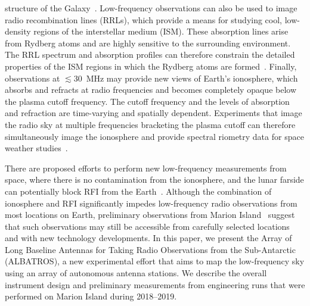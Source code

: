 \documentclass{ws-jai}
\def\albatros{ALBATROS}
\begin{document}
structure of the Galaxy~\citep{2002ApJ...575..217P}.  Low-frequency
observations can also be used to image radio recombination lines
(RRLs), which provide a means for studying cool, low-density regions
of the interstellar medium (ISM).  These absorption lines arise from
Rydberg atoms and are highly sensitive to the surrounding environment.
The RRL spectrum and absorption profiles can therefore constrain the
detailed properties of the ISM regions in which the Rydberg atoms are
formed~\citep{2009NewAR..53..259G, 2007MNRAS.374..852S}.  Finally,
observations at $\lesssim30$~MHz may provide new views of Earth's
ionosphere, which absorbs and refracts at radio frequencies and
becomes completely opaque below the plasma cutoff frequency.  The
cutoff frequency and the levels of absorption and refraction are
time-varying and spatially dependent.  Experiments that image the
radio sky at multiple frequencies bracketing the plasma cutoff can
therefore simultaneously image the ionosphere and provide spectral
riometry data for space weather studies~\citep{2014GeoRL..41.5370K}.

There are proposed efforts to perform new low-frequency measurements
from space, where there is no contamination from the ionosphere, and
the lunar farside can potentially block RFI from the
Earth~\citep{2019arXiv190710853C, 2019arXiv190804296K}.  Although the
combination of ionosphere and RFI significantly impedes low-frequency
radio observations from most locations on Earth, preliminary
observations from Marion Island~\citep{2019JAI.....850004P} suggest
that such observations may still be accessible from carefully selected
locations and with new technology developments.  In this paper, we
present the Array of Long Baseline Antennas for Taking Radio
Observations from the Sub-Antarctic (\albatros), a new experimental
effort that aims to map the low-frequency sky using an array of
autonomous antenna stations.  We describe the overall instrument
design and preliminary measurements from engineering runs that were
performed on Marion Island during 2018--2019.
\end{document}
